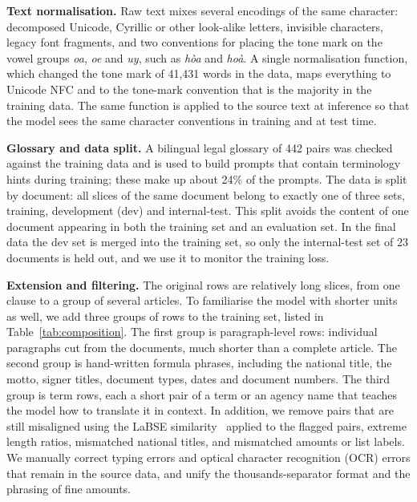 \documentclass[conference]{IEEEtran}
\begin{document}
\textbf{Text normalisation.} Raw text mixes several encodings of the same character: decomposed Unicode, Cyrillic or other look-alike letters, invisible characters, legacy font fragments, and two conventions for placing the tone mark on the vowel groups \emph{oa}, \emph{oe} and \emph{uy}, such as \emph{h\`{o}a} and \emph{ho\`{a}}. A single normalisation function, which changed the tone mark of 41,431 words in the data, maps everything to Unicode NFC and to the tone-mark convention that is the majority in the training data. The same function is applied to the source text at inference so that the model sees the same character conventions in training and at test time.

\textbf{Glossary and data split.} A bilingual legal glossary of 442 pairs was checked against the training data and is used to build prompts that contain terminology hints during training; these make up about 24\% of the prompts. The data is split by document: all slices of the same document belong to exactly one of three sets, training, development (dev) and internal-test. This split avoids the content of one document appearing in both the training set and an evaluation set. In the final data the dev set is merged into the training set, so only the internal-test set of 23 documents is held out, and we use it to monitor the training loss.

\textbf{Extension and filtering.} The original rows are relatively long slices, from one clause to a group of several articles. To familiarise the model with shorter units as well, we add three groups of rows to the training set, listed in Table~\ref{tab:composition}. The first group is paragraph-level rows: individual paragraphs cut from the documents, much shorter than a complete article. The second group is hand-written formula phrases, including the national title, the motto, signer titles, document types, dates and document numbers. The third group is term rows, each a short pair of a term or an agency name that teaches the model how to translate it in context. In addition, we remove pairs that are still misaligned using the LaBSE similarity~\cite{feng2022labse} applied to the flagged pairs, extreme length ratios, mismatched national titles, and mismatched amounts or list labels. We manually correct typing errors and optical character recognition (OCR) errors that remain in the source data, and unify the thousands-separator format and the phrasing of fine amounts.
\end{document}
